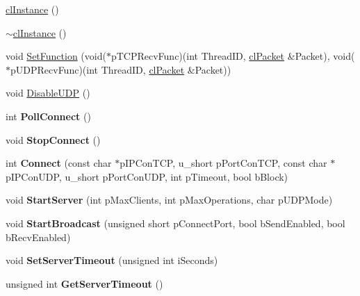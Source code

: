 \begin{DoxyCompactItemize}
\item 
\hyperlink{classcl_instance_a0f7c36b88b2fc0cc5d44447cc76c43a3}{clInstance} ()
\item 
\hyperlink{classcl_instance_aaef41aa3d1383c182de828eea83c2b4f}{$\sim$clInstance} ()
\item 
void \hyperlink{classcl_instance_a1ab07f3683546a1bc64d14042336baaf}{SetFunction} (void($\ast$pTCPRecvFunc)(int ThreadID, \hyperlink{classcl_packet}{clPacket} \&Packet), void($\ast$pUDPRecvFunc)(int ThreadID, \hyperlink{classcl_packet}{clPacket} \&Packet))
\item 
void \hyperlink{classcl_instance_a4f908b49d9b10bad89d1349bf7e202ed}{DisableUDP} ()
\item 
\hypertarget{classcl_instance_aae33868b5384d6e3c25a28818a264699}{
int {\bfseries PollConnect} ()}
\label{classcl_instance_aae33868b5384d6e3c25a28818a264699}

\item 
\hypertarget{classcl_instance_a2c1112a5f5a3cc97ad1bcbf8773b9180}{
void {\bfseries StopConnect} ()}
\label{classcl_instance_a2c1112a5f5a3cc97ad1bcbf8773b9180}

\item 
\hypertarget{classcl_instance_ad92179fe9a33c1dc5573bc9adb3adb6e}{
int {\bfseries Connect} (const char $\ast$pIPConTCP, u\_\-short pPortConTCP, const char $\ast$pIPConUDP, u\_\-short pPortConUDP, int pTimeout, bool bBlock)}
\label{classcl_instance_ad92179fe9a33c1dc5573bc9adb3adb6e}

\item 
\hypertarget{classcl_instance_a498a3a77413b7dfcd4869f8c077dbd98}{
void {\bfseries StartServer} (int pMaxClients, int pMaxOperations, char pUDPMode)}
\label{classcl_instance_a498a3a77413b7dfcd4869f8c077dbd98}

\item 
\hypertarget{classcl_instance_a99d7ca89d5e439b79c9cecb8c7e0acb4}{
void {\bfseries StartBroadcast} (unsigned short pConnectPort, bool bSendEnabled, bool bRecvEnabled)}
\label{classcl_instance_a99d7ca89d5e439b79c9cecb8c7e0acb4}

\item 
\hypertarget{classcl_instance_a13445cabb473ec84876486b49880ea42}{
void {\bfseries SetServerTimeout} (unsigned int iSeconds)}
\label{classcl_instance_a13445cabb473ec84876486b49880ea42}

\item 
\hypertarget{classcl_instance_a0d8333344042cfebf7847a1b81ec62ac}{
unsigned int {\bfseries GetServerTimeout} ()}
\label{classcl_instance_a0d8333344042cfebf7847a1b81ec62ac}


\end{DoxyCompactItemize}
